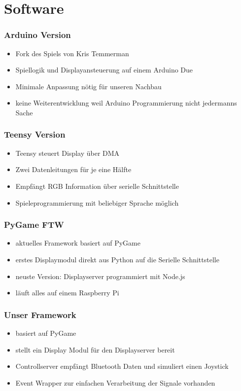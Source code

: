 \documentclass[aspectratio=1610,svgnames]{beamer}
\newcommand{\divider}[1]{\begin{frame} %
\begin{alertblock}{} %
\centering\usebeamerfont{section title}#1 %
\end{alertblock} %
\end{frame}}
\begin{document}
\section{Software}
\divider{\insertsection}
\begin{frame}[<+->]
    \frametitle{Arduino Version}
    \begin{itemize}
        \item Fork des Spiels von Kris Temmerman
        \item Spiellogik und Displayansteuerung auf einem Arduino Due
        \item Minimale Anpassung nötig für unseren Nachbau
        \item keine Weiterentwicklung weil Arduino Programmierung nicht jedermanns Sache
    \end{itemize}
\end{frame}
\begin{frame}[<+->]
    \frametitle{Teensy Version}
    \begin{itemize}
        \item Teensy steuert Display über DMA
        \item Zwei Datenleitungen für je eine Hälfte
        \item Empfängt RGB Information über serielle Schnittstelle
        \item Spieleprogrammierung mit beliebiger Sprache möglich
    \end{itemize}
\end{frame}
\begin{frame}[<+->]
    \frametitle{PyGame FTW}
    \begin{itemize}
        \item aktuelles Framework basiert auf PyGame
        \item erstes Displaymodul direkt aus Python auf die Serielle Schnittstelle
        \item neuste Version: Displayserver programmiert mit Node.js
        \item läuft alles auf einem Raspberry Pi
    \end{itemize}
\end{frame}
\begin{frame}[<+->]
    \frametitle{Unser Framework}
    \begin{itemize}
        \item basiert auf PyGame
        \item stellt ein Display Modul für den Displayserver bereit
        \item Controllserver empfängt Bluetooth Daten und simuliert einen Joystick
        \item Event Wrapper zur einfachen Verarbeitung der Signale vorhanden
    \end{itemize}
\end{frame}
\end{document}
